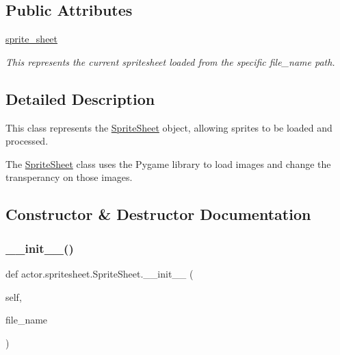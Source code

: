 \subsection*{Public Attributes}
\begin{DoxyCompactItemize}
\item 
\hyperlink{classactor_1_1spritesheet_1_1_sprite_sheet_ae4eb015142736df995f9564c47f4ddd6}{sprite\+\_\+sheet}
\begin{DoxyCompactList}\small\item\em This represents the current spritesheet loaded from the specific file\+\_\+name path. \end{DoxyCompactList}\end{DoxyCompactItemize}


\subsection{Detailed Description}
This class represents the \hyperlink{classactor_1_1spritesheet_1_1_sprite_sheet}{Sprite\+Sheet} object, allowing sprites to be loaded and processed. 

The \hyperlink{classactor_1_1spritesheet_1_1_sprite_sheet}{Sprite\+Sheet} class uses the Pygame library to load images and change the transperancy on those images. 

\subsection{Constructor \& Destructor Documentation}
\mbox{\label{classactor_1_1spritesheet_1_1_sprite_sheet_a00df0cb80c019436add7a699a83c5ae2}} 
\subsubsection{\texorpdfstring{\+\_\+\+\_\+init\+\_\+\+\_\+()}{\_\_init\_\_()}}
{\footnotesize\ttfamily def actor.\+spritesheet.\+Sprite\+Sheet.\+\_\+\+\_\+init\+\_\+\+\_\+ (\begin{DoxyParamCaption}\item[{}]{self,  }\item[{}]{file\+\_\+name }\end{DoxyParamCaption})}



